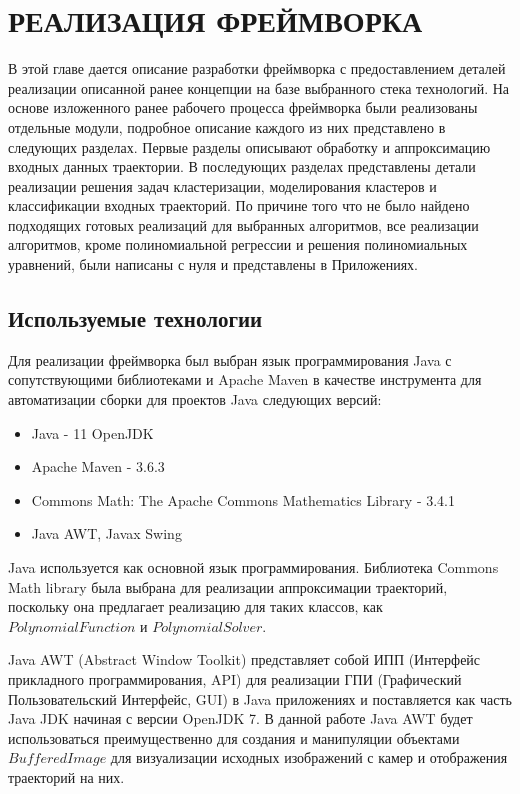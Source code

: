 \chapter{РЕАЛИЗАЦИЯ ФРЕЙМВОРКА}
\label{ch:РЕАЛИЗАЦИЯ ФРЕЙМВОРКА}

В этой главе дается описание разработки фреймворка с предоставлением деталей реализации описанной ранее концепции на базе выбранного стека технологий. На основе изложенного ранее рабочего процесса фреймворка были реализованы отдельные модули, подробное описание каждого из них представлено в следующих разделах. Первые разделы описывают обработку и аппроксимацию входных данных траектории. В последующих разделах представлены детали реализации решения задач кластеризации, моделирования кластеров и классификации входных траекторий. По причине того что не было найдено подходящих готовых реализаций для выбранных алгоритмов, все реализации алгоритмов, кроме полиномиальной регрессии и решения полиномиальных уравнений, были написаны с нуля и представлены в Приложениях.

\section{Используемые технологии}

Для реализации фреймворка был выбран язык программирования Java с сопутствующими библиотеками и Apache Maven в качестве инструмента для автоматизации сборки для проектов Java следующих версий:

\begin{itemize}
	\item Java - 11 OpenJDK
	\item Apache Maven - 3.6.3
	\item Commons Math: The Apache Commons Mathematics Library - 3.4.1
	\item Java AWT, Javax Swing 
\end{itemize}

Java используется как основной язык программирования. Библиотека Commons Math library была выбрана для реализации аппроксимации траекторий, поскольку она предлагает реализацию для таких классов, как $PolynomialFunction$ и $PolynomialSolver$. 

Java AWT (Abstract Window Toolkit) представляет собой ИПП (Интерфейс прикладного программирования, API) для реализации ГПИ (Графический Пользовательский Интерфейс, GUI) в Java приложениях и поставляется как часть Java JDK начиная с версии OpenJDK 7. В данной работе Java AWT будет использоваться преимущественно для создания и манипуляции объектами $BufferedImage$ для визуализации исходных изображений с камер и отображения траекторий на них.

